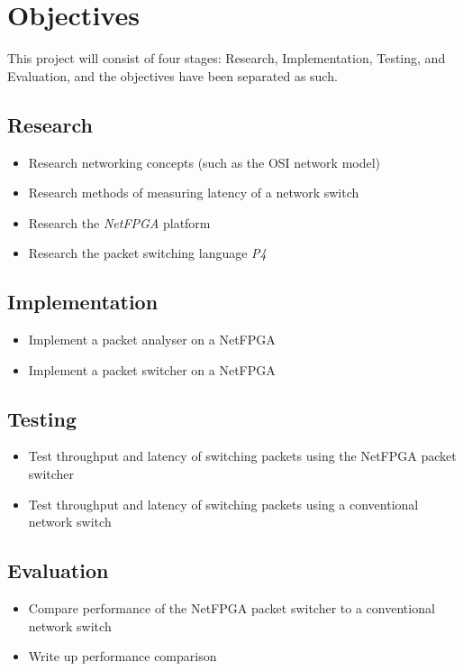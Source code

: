 \documentclass[12pt, a4paper, twoside, onecolumn]{article}
\begin{document}
\section{Objectives}
\label{objectives}
This project will consist of four stages: Research, Implementation, Testing, and Evaluation, and the objectives have been separated as such.

\subsection{Research}
\begin{itemize}
  \item Research networking concepts (such as the OSI network model)
  \item Research methods of measuring latency of a network switch
  \item Research the \textit{NetFPGA} platform \cite{NetFPGA}
  \item Research the packet switching language \textit{P4} \cite{P4}
\end{itemize}
\subsection{Implementation}
\begin{itemize}
  \item Implement a packet analyser on a NetFPGA
  \item Implement a packet switcher on a NetFPGA
\end{itemize}
\subsection{Testing}
\begin{itemize}
  \item Test throughput and latency of switching packets using the NetFPGA packet switcher
  \item Test throughput and latency of switching packets using a conventional network switch
\end{itemize}
\subsection{Evaluation}
\begin{itemize}
  \item Compare performance of the NetFPGA packet switcher to a conventional network switch
  \item Write up performance comparison
\end{itemize}
\end{document}
